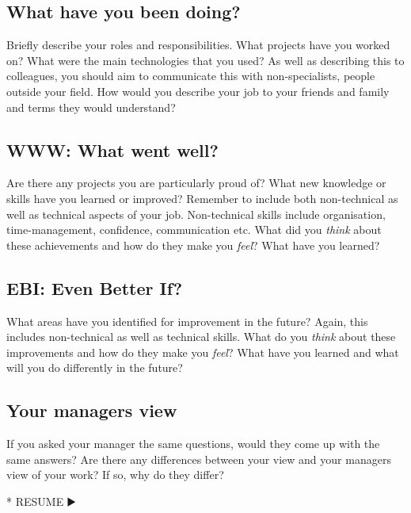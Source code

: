 \documentclass[
]{book}
\newenvironment{Shaded}{\begin{snugshade}}{\end{snugshade}}
\newcommand{\NormalTok}[1]{#1}
\newcommand{\SpecialStringTok}[1]{\textcolor[rgb]{0.31,0.60,0.02}{#1}}
\begin{document}
\hypertarget{what-have-you-been-doing}{%
\subsection{What have you been doing?}\label{what-have-you-been-doing}}

Briefly describe your roles and responsibilities. What projects have you worked on? What were the main technologies that you used? As well as describing this to colleagues, you should aim to communicate this with non-specialists, people outside your field. How would you describe your job to your friends and family and terms they would understand?

\hypertarget{www-what-went-well}{%
\subsection{WWW: What went well?}\label{www-what-went-well}}

Are there any projects you are particularly proud of? What new knowledge or skills have you learned or improved? Remember to include both non-technical as well as technical aspects of your job. Non-technical skills include organisation, time-management, confidence, communication etc. What did you \emph{think} about these achievements and how do they make you \emph{feel}? What have you learned?

\hypertarget{ebi-even-better-if}{%
\subsection{EBI: Even Better If?}\label{ebi-even-better-if}}

What areas have you identified for improvement in the future? Again, this includes non-technical as well as technical skills. What do you \emph{think} about these improvements and how do they make you \emph{feel}? What have you learned and what will you do differently in the future?

\hypertarget{your-managers-view}{%
\subsection{Your managers view}\label{your-managers-view}}

If you asked your manager the same questions, would they come up with the same answers? Are there any differences between your view and your managers view of your work? If so, why do they differ?

\begin{Shaded}
\begin{Highlighting}[]
\SpecialStringTok{* }\NormalTok{RESUME ▶️}
\end{Highlighting}
\end{Shaded}
\end{document}
